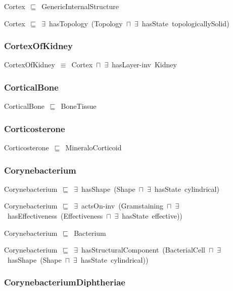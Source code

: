 \documentclass{article}
\begin{document}
Cortex~\ensuremath{\sqsubseteq}~GenericInternalStructure~

Cortex~\ensuremath{\sqsubseteq}~\ensuremath{\exists}~hasTopology~(Topology~\ensuremath{\sqcap}~\ensuremath{\exists}~hasState~topologicallySolid)~

\subsubsection*{CortexOfKidney}

CortexOfKidney~\ensuremath{\equiv}~Cortex~\ensuremath{\sqcap}~\ensuremath{\exists}~hasLayer-inv~Kidney

\subsubsection*{CorticalBone}

CorticalBone~\ensuremath{\sqsubseteq}~BoneTissue~

\subsubsection*{Corticosterone}

Corticosterone~\ensuremath{\sqsubseteq}~MineraloCorticoid~

\subsubsection*{Corynebacterium}

Corynebacterium~\ensuremath{\sqsubseteq}~\ensuremath{\exists}~hasShape~(Shape~\ensuremath{\sqcap}~\ensuremath{\exists}~hasState~cylindrical)~

Corynebacterium~\ensuremath{\sqsubseteq}~\ensuremath{\exists}~actsOn-inv~(Gramstaining~\ensuremath{\sqcap}~\ensuremath{\exists}~hasEffectiveness~(Effectiveness~\ensuremath{\sqcap}~\ensuremath{\exists}~hasState~effective))~

Corynebacterium~\ensuremath{\sqsubseteq}~Bacterium~

Corynebacterium~\ensuremath{\sqsubseteq}~\ensuremath{\exists}~hasStructuralComponent~(BacterialCell~\ensuremath{\sqcap}~\ensuremath{\exists}~hasShape~(Shape~\ensuremath{\sqcap}~\ensuremath{\exists}~hasState~cylindrical))~

\subsubsection*{CorynebacteriumDiphtheriae}
\end{document}
